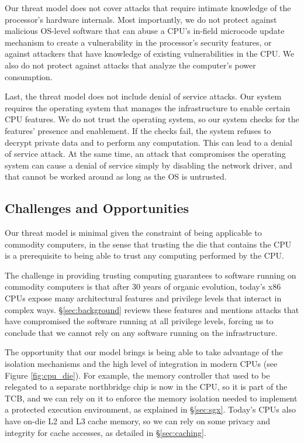 Our threat model does not cover attacks that require intimate knowledge of the
processor's hardware internals. Most importantly, we do not protect against
malicious OS-level software that can abuse a CPU's in-field microcode update
mechanism to create a vulnerability in the processor's security features, or
against attackers that have knowledge of existing vulnerabilities in the CPU.
We also do not protect against attacks that analyze the computer's power
consumption.

Last, the threat model does not include denial of service attacks. Our system
requires the operating system that manages the infrastructure to enable certain
CPU features. We do not trust the operating system, so our system checks for
the features' presence and enablement. If the checks fail, the system refuses
to decrypt private data and to perform any computation. This can lead to a
denial of service attack. At the same time, an attack that compromises the
operating system can cause a denial of service simply by disabling the network
driver, and that cannot be worked around as long as the OS is untrusted.


\subsection{Challenges and Opportunities}

Our threat model is minimal given the constraint of being applicable to
commodity computers, in the sense that trusting the die that contains the CPU
is a prerequisite to being able to trust any computing performed by the CPU.

The challenge in providing trusting computing guarantees to software running on
commodity computers is that after 30 years of organic evolution, today's x86
CPUs expose many architectural features and privilege levels that interact in
complex ways. \S \ref{sec:background} reviews these features and mentions
attacks that have compromised the software running at all privilege levels,
forcing us to conclude that we cannot rely on any software running on the
infrastructure.

The opportunity that our model brings is being able to take advantage of the
isolation mechanisms and the high level of integration in modern CPUs (see
Figure \ref{fig:cpu_die}). For example, the memory controller that used to be
relegated to a separate northbridge chip is now in the CPU, so it is part of
the TCB, and we can rely on it to enforce the memory isolation needed to
implement a protected execution environment, as explained in \S \ref{sec:sgx}.
Today's CPUs also have on-die L2 and L3 cache memory, so we can rely on some
privacy and integrity for cache accesses, as detailed in \S \ref{sec:caching}.

